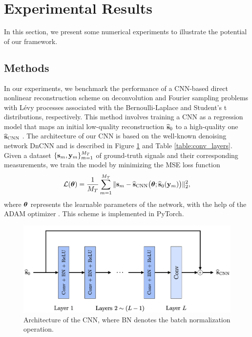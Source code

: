 \documentclass[journal]{IEEEtran}
\begin{document}
\section{Experimental Results}
In this section, we present some numerical experiments to illustrate the potential of our framework.

\subsection{Methods}
In our experiments, we benchmark the performance of a CNN-based direct nonlinear reconstruction scheme on deconvolution and Fourier sampling problems with L\'{e}vy processes associated with the Bernoulli-Laplace and Student's t distributions, respectively. This method involves training a CNN as a regression model that maps an initial low-quality reconstruction $\widehat{{\bf{s}}}_{0}$ to a high-quality one $\widehat{{\bf{s}}}_{\text{CNN}}$ \cite{jin2017deep,chen2017low,hyun2018deep, monakhova2019learned,perdios2020cnn}. The architecture of our CNN is based on the well-known denoising network DnCNN \cite{zhang2017beyond} and is described in Figure \ref{fig:CNN_architecture} and Table \ref{table:conv_layers}. Given a dataset $\{{\bf{s}}_{m}, {\bf{y}}_m\}_{m=1}^{M_T}$ of ground-truth signals and their corresponding measurements, we train the model by minimizing the MSE loss function
\begin{equation}
    \mathcal{L}({\boldsymbol{\theta}}) = \frac{1}{M_T} \sum_{m=1}^{M_T} \|{\bf{s}}_{m} - \widehat{{\bf{s}}}_{\text{CNN}}\big({\boldsymbol{\theta}}; \widehat{{\bf{s}}}_{0}({\bf{y}}_m)\big) \|_{2}^{2},
\end{equation}
where ${\boldsymbol{\theta}}$ represents the learnable parameters of the network, with the help of the ADAM optimizer \cite{kingma2014adam}. This scheme is implemented in PyTorch.

\begin{figure}[t]
    \centering
    \includegraphics[width=\linewidth]{figures/cnn_architecture.png}
    \caption{Architecture of the CNN, where BN denotes the batch normalization operation.}
    \label{fig:CNN_architecture}
\end{figure}
\end{document}

